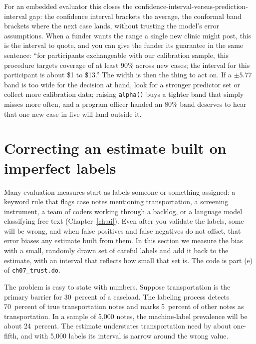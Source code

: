 For an embedded evaluator this closes the confidence-interval-versus-prediction-interval gap: the confidence interval brackets the average, the conformal band brackets where the next case lands, without trusting the model's error assumptions. When a funder wants the range a single new clinic might post, this is the interval to quote, and you can give the funder its guarantee in the same sentence: \enquote{for participants exchangeable with our calibration sample, this procedure targets coverage of at least 90\% across new cases; the interval for this participant is about \$1 to \$13.} The width is then the thing to act on. If a $\pm 5.77$ band is too wide for the decision at hand, look for a stronger predictor set or collect more calibration data; raising \texttt{alpha()} buys a tighter band that simply misses more often, and a program officer handed an 80\% band deserves to hear that one new case in five will land outside it.

\section{Correcting an estimate built on imperfect labels}\label{sec:ppi}
Many evaluation measures start as labels someone or something assigned: a keyword rule that flags case notes mentioning transportation, a screening instrument, a team of coders working through a backlog, or a language model classifying free text (Chapter~\ref{ch:ai}). Even after you validate the labels, some will be wrong, and when false positives and false negatives do not offset, that error biases any estimate built from them. In this section we measure the bias with a small, randomly drawn set of careful labels and add it back to the estimate, with an interval that reflects how small that set is. The code is part (e) of \texttt{ch07\_trust.do}.

The problem is easy to state with numbers. Suppose transportation is the primary barrier for 30~percent of a caseload. The labeling process detects 70~percent of true transportation notes and marks 5~percent of other notes as transportation. In a sample of 5{,}000 notes, the machine-label prevalence will be about 24~percent. The estimate understates transportation need by about one-fifth, and with 5{,}000 labels its interval is narrow around the wrong value.

